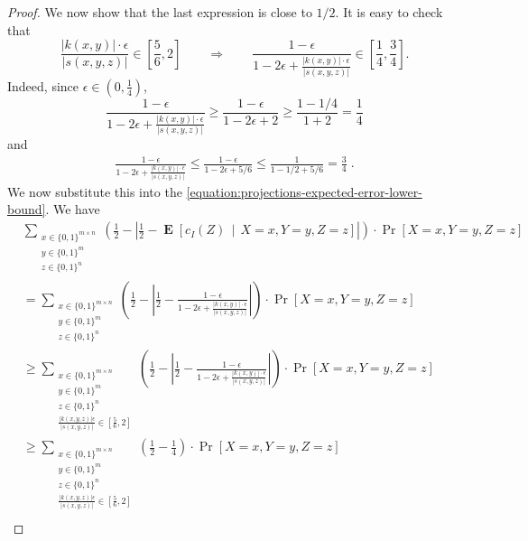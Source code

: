 \documentclass[11pt]{article}
\DeclareMathOperator{\Exp}{\mathbf{E}}
\begin{document}
\begin{proof}
We now show that the last expression is close to $1/2$. It is easy to check that
$$
\frac{|k(x,y)| \cdot \epsilon}{|s(x,y,z)|} \in \left[\frac{5}{6}, 2 \right] \qquad \Longrightarrow \qquad \frac{\displaystyle 1 - \epsilon}{\displaystyle 1 - 2\epsilon + \frac{|k(x,y)| \cdot \epsilon}{|s(x,y,z)|}} \in \left[ \frac{1}{4}, \frac{3}{4} \right].
$$
Indeed, since $\epsilon \in (0,\frac{1}{4})$,
$$
\frac{\displaystyle 1 - \epsilon}{\displaystyle 1 - 2\epsilon + \frac{|k(x,y)| \cdot \epsilon}{|s(x,y,z)|}} \ge
\frac{\displaystyle 1 - \epsilon}{\displaystyle 1 - 2\epsilon + 2} \ge \frac{\displaystyle 1 - 1/4}{\displaystyle 1 + 2} = \frac{1}{4}
$$
and
\begin{align*}
\frac{\displaystyle 1 - \epsilon}{\displaystyle 1 - 2\epsilon + \frac{|k(x,y)| \cdot \epsilon}{|s(x,y,z)|}}
\le \frac{\displaystyle 1 - \epsilon}{\displaystyle 1 - 2\epsilon + 5/6} 
\le \frac{\displaystyle 1}{\displaystyle 1 - 1/2 + 5/6} = \frac{3}{4} \; .
\end{align*}
We now substitute this into the \eqref{equation:projections-expected-error-lower-bound}. We have
\begin{align*}
& \sum_{\substack{x \in \{0,1\}^{m \times n} \\ y \in \{0,1\}^m \\ z \in \{0,1\}^n}} \left( \frac{1}{2} - \left| \frac{1}{2} - \Exp\left[ c_I(Z) \, \middle| \, X = x, Y = y, Z = z \right] \right| \right)   \cdot \Pr \left[X = x, Y = y, Z = z \right] \\
& = \sum_{\substack{x \in \{0,1\}^{m \times n} \\ y \in \{0,1\}^m \\ z \in \{0,1\}^n}} \left( \frac{1}{2} - \left| \frac{1}{2} - \frac{\displaystyle 1 - \epsilon}{\displaystyle 1 - 2\epsilon + \frac{|k(x,y)| \cdot \epsilon}{|s(x,y,z)|}} \right| \right)  \cdot \Pr \left[X = x, Y = y, Z = z \right] \\
& \ge
\sum_{\substack{x \in \{0,1\}^{m \times n} \\ y \in \{0,1\}^m \\ z \in \{0,1\}^n \\ \frac{|k(x,y,z)| \epsilon}{|s(x,y,z)|} \in [\frac{5}{6},2]}} \left( \frac{1}{2} - \left| \frac{1}{2} - \frac{\displaystyle 1 - \epsilon}{\displaystyle 1 - 2\epsilon + \frac{|k(x,y)| \cdot \epsilon}{|s(x,y,z)|}} \right|  \right)   \cdot \Pr \left[X = x, Y = y, Z = z \right] \\
& \ge
\sum_{\substack{x \in \{0,1\}^{m \times n} \\ y \in \{0,1\}^m \\ z \in \{0,1\}^n \\ \frac{|k(x,y,z)| \epsilon}{|s(x,y,z)|} \in [\frac{5}{6},2]}} \left( \frac{1}{2} - \frac{1}{4} \right) \cdot \Pr \left[X = x, Y = y, Z = z \right] \\

\end{align*}
\end{proof}
\end{document}
